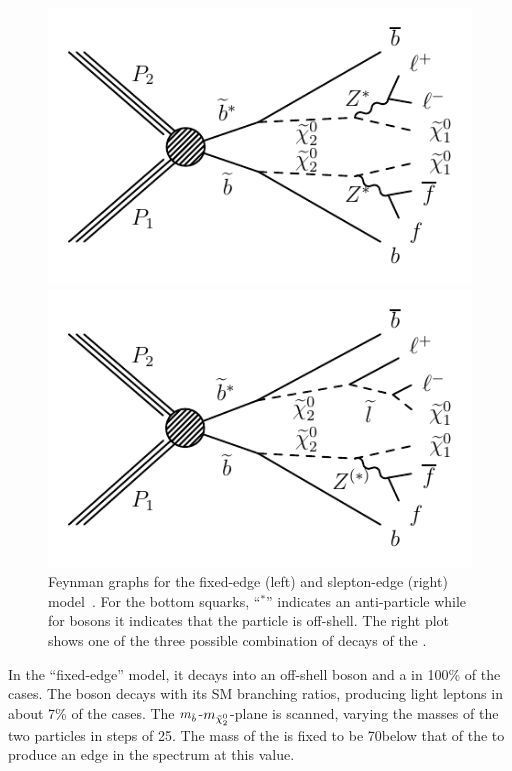 \begin{figure}[htbp]
\centering
\begin{minipage}[t]{0.49\textwidth}
  \includegraphics[width=\textwidth]{plots/THEO/Feynman_graph_T6bblledge.pdf}
\end{minipage}
\begin{minipage}[t]{0.49\textwidth}
\includegraphics[width=\textwidth]{plots/THEO/Feynman_graph_T6bbslepton.pdf}
\end{minipage}
\caption{Feynman graphs for the fixed-edge (left) and slepton-edge (right) model~\cite{Khachatryan:2015lwa}. For the bottom squarks, ``$^{*}$'' indicates an anti-particle while for \Z bosons it indicates that the particle is off-shell. The right plot shows one of the three possible combination of decays of the \secondchi.}
\label{fig:sigFeyn}
\end{figure}

 In the ``fixed-edge'' model, it decays into an off-shell \Z boson and a \firstchi in 100\% of the cases. The \Z boson decays with its SM branching ratios, producing light leptons in about 7\% of the cases. The $m_{\tilde{b}}$-$m_{{\tilde{\chi}^0_2}}$-plane is scanned, varying the masses of the two particles in steps of 25\GeV. The mass of the \firstchi is fixed to be 70\GeV below that of the \secondchi to produce an edge in the \mll spectrum at this value.

